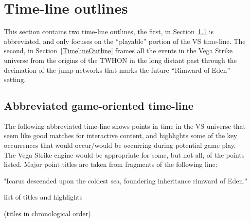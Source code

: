 \label{chapt:timelines}
\section{Time-line outlines}

This section contains two time-line outlines, the first, in
Section~\ref{Abbrevtimeline} is abbreviated, and only focuses on the
``playable'' portion of the VS time-line. The second, in
Section~\ref{TimelineOutline} frames all the events in the Vega Strike
universe from the origins of the TWHON in the long distant past
through the decimation of the jump networks that marks the future
``Rimward of Eden'' setting.


\subsection{Abbreviated game-oriented time-line}
\label{Abbrevtimeline}
The following abbreviated time-line shows points in time in the VS
universe that seem like good matches for interactive content, and
highlights some of the key occurrences that would occur/would be
occurring during potential game play. The Vega Strike engine would be
appropriate for some, but not all, of the points listed. Major point
titles are taken from fragments of the following line:

{\Large \centerline{"Icarus descended upon the coldest sea, foundering inheritance rimward of Eden."}}
list of titles and highlights

(titles in chronological order)

